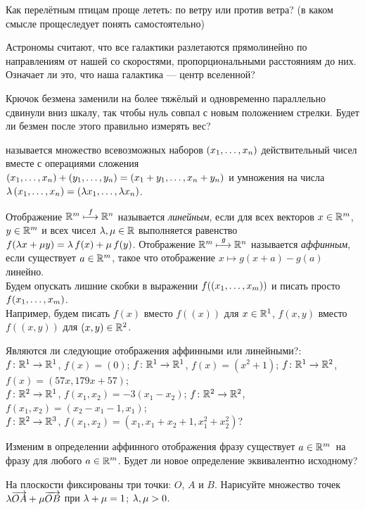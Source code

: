 \documentclass[a4paper,12pt]{article}
\newcommand{\wa}{\overrightarrow}
\begin{document}

Как перелётным птицам проще лететь: по ветру или против ветра? (в каком смысле  проще следует понять самостоятельно)

  Астрономы считают, что все галактики разлетаются
  прямолинейно по направлениям от нашей со скоростями,
  пропорциональными расстояниям до них. Означает ли это, что наша
  галактика --- центр вселенной?

  Крючок безмена заменили на более тяжёлый и одновременно параллельно
  сдвинули вниз шкалу, так чтобы нуль совпал с новым положением
  стрелки. Будет ли безмен после этого правильно измерять вес?

 называется множество всевозможных наборов $(x_1,\ldots, x_n)$ действительный чисел вместе с операциями сложения  $(x_1,\ldots, x_n) + (y_1,\ldots, y_n) = (x_1+y_1,\ldots, x_n+y_n)$ и умножения на числа $\lambda\,(x_1,\ldots, x_n) = (\lambda x_1,\ldots, \lambda x_n)$.

  Отображение $\mathbb{R}^m\stackrel{f}{\longmapsto}\mathbb{R}^n$ называется {\it линейным\/}, если для всех векторов
  $x\in\mathbb{R}^m$, $y\in\mathbb{R}^m$ и всех чисел $\lambda,\mu\in\mathbb{R}$ выполняется
  равенство $f(\lambda x+\mu y)=\lambda\,f(x)+\mu\,f(y)$.
  Отображение $\mathbb{R}^m\stackrel{g}{\longmapsto}\mathbb{R}^n$ называется {\it аффинным\/}, если существует $a\in\mathbb{R}^m$, такое что
  отображение $x\longmapsto g(x+a)-g(a)$ линейно.
  \\
  Будем опускать лишние скобки в выражении $f((x_1,\ldots, x_m))$ и писать просто $f(x_1,\ldots, x_m)$.
  \\Например, будем писать $f(x)$ вместо $f((x))$ для $x\in\mathbb{R}^1$, $f(x, y)$ вместо $f((x, y))$ для $(x,y)\in\mathbb{R}^2$.

 Являются ли следующие отображения аффинными или линейными?:\\
 $f\colon\mathbb{R}^1\rightarrow\mathbb{R}^1$, $f(x)=(0)$;
 $f\colon\mathbb{R}^1\rightarrow\mathbb{R}^1$, $f(x)= (x^2+1)$;
 $f\colon\mathbb{R}^1\rightarrow\mathbb{R}^2$, $f(x)= (57x,179x+57)$;\\
 $f\colon\mathbb{R}^2\rightarrow\mathbb{R}^1$, $f(x_1,x_2)=-3(x_1 - x_2)$;
 $f\colon\mathbb{R}^2\rightarrow\mathbb{R}^2$, $f(x_1,x_2)=(x_2 - x_1 - 1, x_1)$;\\
 $f\colon\mathbb{R}^2\rightarrow\mathbb{R}^3$, $f(x_1,x_2)=(x_1, x_1+x_2+1, x_1^2+x_2^2)$?


  Изменим в определении аффинного отображения фразу  существует
  $a\in\mathbb{R}^m$\ на фразу  для любого $a\in\mathbb{R}^m$. Будет ли
  новое определение эквивалентно исходному?


На плоскости фиксированы три точки: $O$, $A$ и $B$. Нарисуйте множество точек $\la \wa{OA}+\mu\wa{OB}$ при  $\lambda+\mu = 1$;  $\lambda,\mu>0$.
\end{document}
